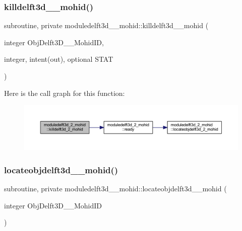 \subsubsection{\texorpdfstring{killdelft3d\+\_\+\_\+mohid()}{killdelft3d\_2\_mohid()}}
{\footnotesize\ttfamily subroutine, private moduledelft3d\+\_\+\_\+mohid\+::killdelft3d\+\_\+\_\+mohid (\begin{DoxyParamCaption}\item[{integer}]{Obj\+Delft3\+D\+\_\+\_\+\+Mohid\+ID,  }\item[{integer, intent(out), optional}]{S\+T\+AT }\end{DoxyParamCaption})\hspace{0.3cm}{\ttfamily [private]}}

Here is the call graph for this function\+:\nopagebreak
\begin{figure}[H]
\begin{center}
\leavevmode
\includegraphics[width=350pt]{namespacemoduledelft3d__2__mohid_a6a2192c5c8e2b5565ca4a3b91cd0ff48_cgraph}
\end{center}
\end{figure}
\mbox{\label{namespacemoduledelft3d__2__mohid_a0d0310530ae347fadb6afd0f39d0b3d2}} 
\subsubsection{\texorpdfstring{locateobjdelft3d\+\_\+\_\+mohid()}{locateobjdelft3d\_2\_mohid()}}
{\footnotesize\ttfamily subroutine, private moduledelft3d\+\_\+\_\+mohid\+::locateobjdelft3d\+\_\+\_\+mohid (\begin{DoxyParamCaption}\item[{integer}]{Obj\+Delft3\+D\+\_\+\_\+\+Mohid\+ID }\end{DoxyParamCaption})\hspace{0.3cm}{\ttfamily [private]}}

